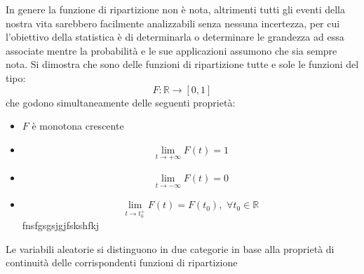 \documentclass[a4paper,12pt, oneside]{book}
\begin{document}
In genere la funzione di ripartizione non è nota, altrimenti tutti gli eventi della nostra vita sarebbero facilmente analizzabili
senza nessuna incertezza, per cui l'obiettivo della statistica è di determinarla o determinare le grandezza ad essa associate
mentre la probabilità e le sue applicazioni assumono che sia sempre nota.
Si dimostra che sono delle funzioni di ripartizione tutte e sole le funzioni del tipo:
\[F:\mathbb{R}\to[0,1]\]
\newpage
che godono simultaneamente delle seguenti proprietà:
\begin{itemize}
\item $F$ è monotona crescente
\item \[\lim_{t\to+\infty} F(t)=1\]
\item \[\lim_{t\to-\infty} F(t)=0\]
\item \[\lim_{t\to t_0^+} F(t)=F(t_0),\,\,\forall t_0\in\mathbb{R}\]
     fnsfgsgsjgjfskshfkj   
\end{itemize}
Le variabili aleatorie si distinguono in due categorie in base alla proprietà di continuità delle corrispondenti funzioni di ripartizione
\end{document}
